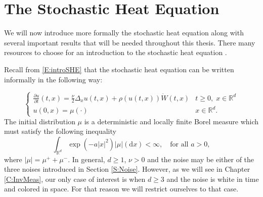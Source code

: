 \documentclass[12pt]{report}
\theoremstyle{plain}
\theoremstyle{definition}
\numberwithin{equation}{section}
\newcommand{\R}{\mathbb{R}}
\newcommand{\ud}{\ensuremath{ \mathrm{d} }}
\begin{document}
\section {The Stochastic Heat Equation} \label{S:SHE}
We will now introduce more formally the stochastic heat equation along with several important results that will be needed throughout this thesis. There many resources to choose for an introduction to the stochastic heat equation \cite{chen.dalang:15:moments, chen.kim:19:nonlinear, dalang.khoshnevisan.ea:09:minicourse, da-prato.zabczyk:92:stochastic, khoshnevisan.cbms.2014, walsh:86:introduction}. 

Recall from \eqref{E:introSHE} that the stochastic heat equation can be written informally in the following way:
	
	\begin{equation}\label{E:SHE}
\begin{cases}
\frac{\partial u}{\partial t}(t,x)  = \frac{\nu}{2} \Delta_xu(t,x) + \rho(u(t,x))\dot{W}(t,x) & t \ge 0, \; x \in \R^d \\
u(0,x) = \mu(\cdot) & x \in \R^d.
\end{cases}
\end{equation}
The initial distribution $\mu$ is a deterministic and locally finite Borel measure which must satisfy the following inequality 
	\begin{equation}\label{A:InitCon}
		\int_{\R^d} \exp\left(-a |x|^2\right) |\mu|(\ud x) < \infty, \quad \text{for all } a > 0,
	\end{equation}
where $|\mu| = \mu^+ + \mu^-$. In general, $d \ge 1$, $\nu >0$ and the noise may be either of the three noises introduced in Section \ref{S:Noise}. However, as we will see in Chapter \ref{C:InvMeas}, our only case of interest is when $d \ge 3$ and the noise is white in time and colored in space. For that reason we will restrict ourselves to that case.
\end{document}
